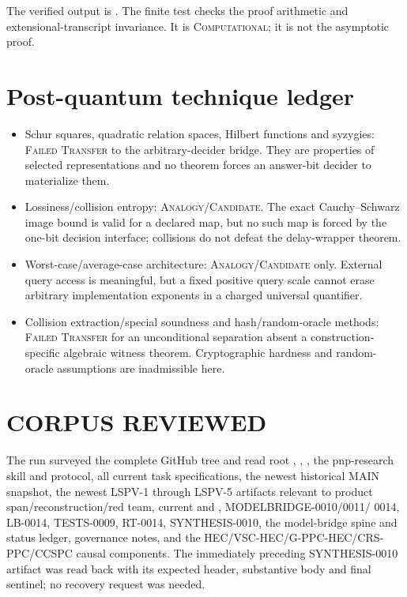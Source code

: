 \documentclass[11pt]{article}
\newcommand{\status}[1]{\textsc{#1}}
\begin{document}
The verified output is
.
The finite test checks the proof arithmetic and extensional-transcript
invariance.  It is \status{Computational}; it is not the asymptotic proof.

\section{Post-quantum technique ledger}

\begin{itemize}[leftmargin=1.5em]
\item Schur squares, quadratic relation spaces, Hilbert functions and
      syzygies: \status{Failed Transfer} to the arbitrary-decider bridge.
      They are properties of selected representations and no theorem forces
      an answer-bit decider to materialize them.
\item Lossiness/collision entropy: \status{Analogy/Candidate}.  The exact
      Cauchy--Schwarz image bound is valid for a declared map, but no such map
      is forced by the one-bit decision interface; collisions do not defeat
      the delay-wrapper theorem.
\item Worst-case/average-case architecture: \status{Analogy/Candidate} only.
      External query access is meaningful, but a fixed positive query scale
      cannot erase arbitrary implementation exponents in a charged universal
      quantifier.
\item Collision extraction/special soundness and hash/random-oracle methods:
      \status{Failed Transfer} for an unconditional separation absent a
      construction-specific algebraic witness theorem.  Cryptographic
      hardness and random-oracle assumptions are inadmissible here.
\end{itemize}

\section{CORPUS REVIEWED}

The run surveyed the complete GitHub tree and read root ,
, , the pnp-research skill and protocol, all
current task specifications, the newest historical MAIN snapshot, the newest
LSPV-1 through LSPV-5 artifacts relevant to product span/reconstruction/red
team, current  and , MODELBRIDGE-0010/0011/
0014, LB-0014, TESTS-0009, RT-0014, SYNTHESIS-0010, the model-bridge spine and
status ledger, governance notes, and the HEC/VSC-HEC/G-PPC-HEC/CRS-PPC/CCSPC
causal components.  The immediately preceding SYNTHESIS-0010 artifact was
read back with its expected header, substantive body and final sentinel; no
recovery request was needed.
\end{document}
